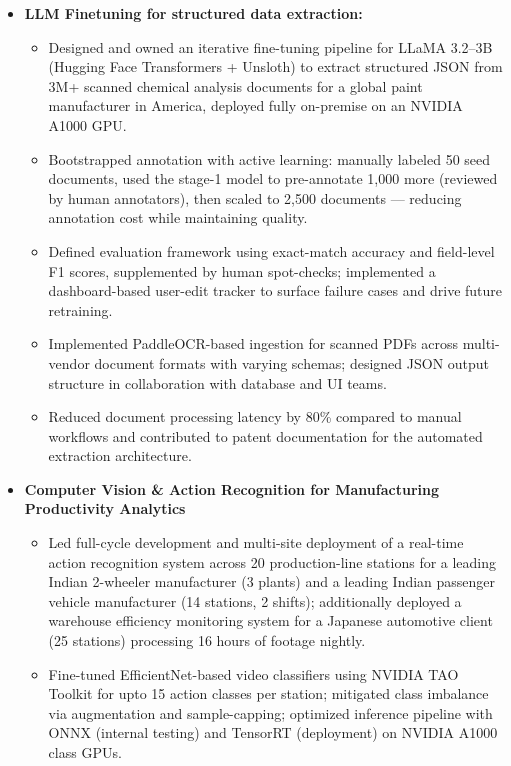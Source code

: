 \documentclass[a4paper,11pt]{article}
\begin{document}
    \begin{itemize}[leftmargin=*, itemsep = -1pt]
      \item {\textbf{LLM Finetuning for structured data extraction:}}
      \begin{itemize}[itemsep = -1pt]
        \item {Designed and owned an iterative fine-tuning pipeline for LLaMA 3.2--3B (Hugging Face Transformers + Unsloth) to extract structured JSON from 3M+ scanned chemical analysis documents for a global paint manufacturer in America, deployed fully on-premise on an NVIDIA A1000 GPU.}
        \item {Bootstrapped annotation with active learning: manually labeled 50 seed documents, used the stage-1 model to pre-annotate 1,000 more (reviewed by human annotators), then scaled to 2,500 documents — reducing annotation cost while maintaining quality.}
        \item {Defined evaluation framework using exact-match accuracy and field-level F1 scores, supplemented by human spot-checks; implemented a dashboard-based user-edit tracker to surface failure cases and drive future retraining.}
        \item {Implemented PaddleOCR-based ingestion for scanned PDFs across multi-vendor document formats with varying schemas; designed JSON output structure in collaboration with database and UI teams.}
        \item {Reduced document processing latency by 80\% compared to manual workflows and contributed to patent documentation for the automated extraction architecture.}
      \end{itemize}\vspace{-1pt}
      \item {\textbf{Computer Vision \& Action Recognition for Manufacturing Productivity Analytics}}
        \begin{itemize}[itemsep = -1pt]
          \item {Led full-cycle development and multi-site deployment of a real-time action recognition system across 20 production-line stations for a leading Indian 2-wheeler manufacturer (3 plants) and a leading Indian passenger vehicle manufacturer (14 stations, 2 shifts); additionally deployed a warehouse efficiency monitoring system for a Japanese automotive client (25 stations) processing 16 hours of footage nightly.}
          \item {Fine-tuned EfficientNet-based video classifiers using NVIDIA TAO Toolkit for upto 15 action classes per station; mitigated class imbalance via augmentation and sample-capping; optimized inference pipeline with ONNX (internal testing) and TensorRT (deployment) on NVIDIA A1000 class GPUs.}

\end{itemize}
\end{itemize}
\end{document}
